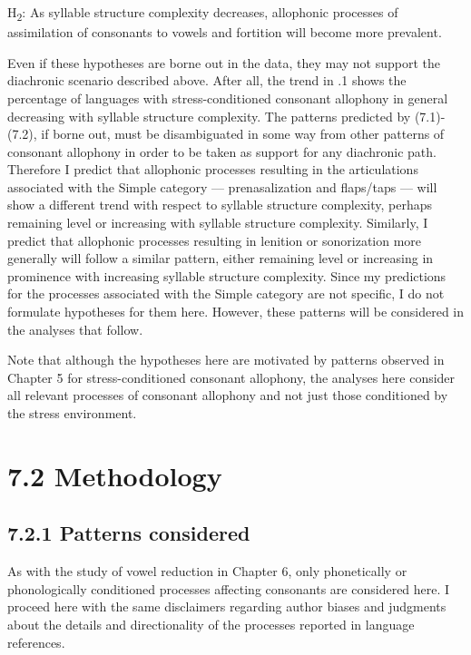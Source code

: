 \ea\label{ex:(7.2)}
  H\textsubscript{2}: As syllable structure complexity decreases, allophonic processes of assimilation of consonants to vowels and fortition will become more prevalent.
\z



  Even if these hypotheses are borne out in the data, they may not support the diachronic scenario described above. After all, the trend in .1 shows the percentage of languages with stress-conditioned consonant allophony in general decreasing with syllable structure complexity. The patterns predicted by (7.1)-(7.2), if borne out, must be disambiguated in some way from other patterns of consonant allophony in order to be taken as support for any diachronic path. Therefore I predict that allophonic processes resulting in the articulations associated with the Simple category — prenasalization and flaps/taps — will show a different trend with respect to syllable structure complexity, perhaps remaining level or increasing with syllable structure complexity. Similarly, I predict that allophonic processes resulting in lenition or sonorization more generally will follow a similar pattern, either remaining level or increasing in prominence with increasing syllable structure complexity. Since my predictions for the processes associated with the Simple category are not specific, I do not formulate hypotheses for them here. However, these patterns will be considered in the analyses that follow.



  Note that although the hypotheses here are motivated by patterns observed in Chapter 5 for stress-conditioned consonant allophony, the analyses here consider all relevant processes of consonant allophony and not just those conditioned by the stress environment.


\section{7.2 Methodology}
\subsection{7.2.1 Patterns considered}

  As with the study of vowel reduction in Chapter 6, only phonetically or phonologically conditioned processes affecting consonants are considered here. I proceed here with the same disclaimers regarding author biases and judgments about the details and directionality of the processes reported in language references.



